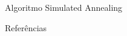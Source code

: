 \documentclass[aspectratio=169,11pt]{beamer}
\begin{document}
\begin{frame}{Algoritmo Simulated Annealing}
    
\end{frame}

\begin{frame}[allowframebreaks]{Referências}

\end{frame}
\end{document}
